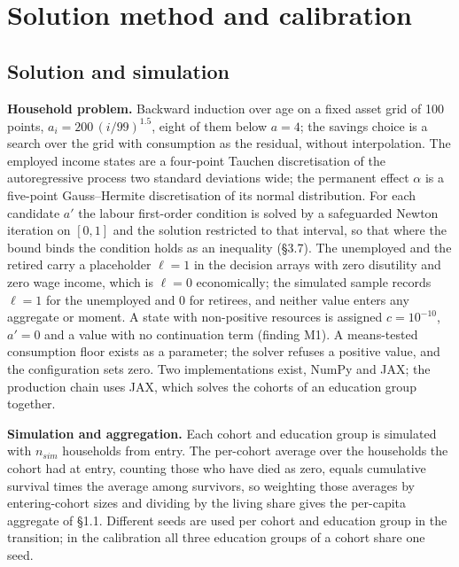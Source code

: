 \documentclass[11pt,a4paper]{article}
\begin{document}
\section{Solution method and calibration}

\subsection{Solution and simulation}\label{sec:solution}

\textbf{Household problem.} Backward induction over age on a fixed asset grid of 100 points, $a_i = 200\,(i/99)^{1.5}$, eight of them below $a = 4$; the savings choice is a search over the grid with consumption as the residual, without interpolation. The employed income states are a four-point Tauchen discretisation of the autoregressive process two standard deviations wide; the permanent effect $\alpha$ is a five-point Gauss--Hermite discretisation of its normal distribution. For each candidate $a'$ the labour first-order condition is solved by a safeguarded Newton iteration on $[0, 1]$ and the solution restricted to that interval, so that where the bound binds the condition holds as an inequality (\S3.7). The unemployed and the retired carry a placeholder $\ell = 1$ in the decision arrays with zero disutility and zero wage income, which is $\ell = 0$ economically; the simulated sample records $\ell = 1$ for the unemployed and $0$ for retirees, and neither value enters any aggregate or moment. A state with non-positive resources is assigned $c = 10^{-10}$, $a' = 0$ and a value with no continuation term (finding M1). A means-tested consumption floor exists as a parameter; the solver refuses a positive value, and the configuration sets zero. Two implementations exist, NumPy and JAX; the production chain uses JAX, which solves the cohorts of an education group together.

\textbf{Simulation and aggregation.} Each cohort and education group is simulated with $n_{sim}$ households from entry. The per-cohort average over the households the cohort had at entry, counting those who have died as zero, equals cumulative survival times the average among survivors, so weighting those averages by entering-cohort sizes and dividing by the living share gives the per-capita aggregate of \S1.1. Different seeds are used per cohort and education group in the transition; in the calibration all three education groups of a cohort share one seed.
\end{document}
